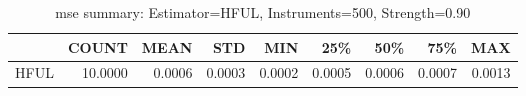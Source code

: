 \begin{table}[ht]
\centering
\caption{mse summary: Estimator=HFUL, Instruments=500, Strength=0.90}
\begin{tabular}{lrrrrrrrr}
\toprule
 & COUNT & MEAN & STD & MIN & 25\% & 50\% & 75\% & MAX \\
\midrule
HFUL & 10.0000 & 0.0006 & 0.0003 & 0.0002 & 0.0005 & 0.0006 & 0.0007 & 0.0013 \\
\bottomrule
\end{tabular}
\end{table}
